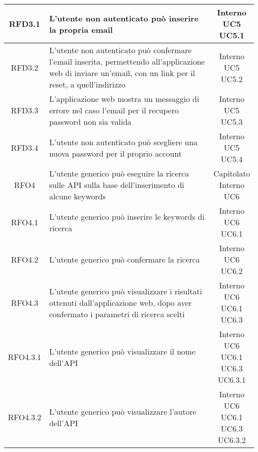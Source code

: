 \begin{longtable}{|c|p{8cm}|c|}
\hypertarget{RFD3.1}{RFD3.1} & L'utente non autenticato può inserire la propria email & \makecell*{Interno\\UC5\\UC5.1} \\
\hline
\hypertarget{RFD3.2}{RFD3.2} & L'utente non autenticato può confermare l'email inserita, permettendo all'applicazione web di inviare un'email, con un link per il reset, a quell'indirizzo & \makecell*{Interno\\UC5\\UC5.2} \\
\hline
\hypertarget{RFD3.3}{RFD3.3} & L'applicazione web mostra un messaggio di errore nel caso l'email per il recupero password non sia valida & \makecell*{Interno\\UC5\\UC5.3} \\
\hline
\hypertarget{RFD3.4}{RFD3.4} & L'utente non autenticato può scegliere una nuova password per il proprio account & \makecell*{Interno\\UC5\\UC5.4} \\
\hline

\hypertarget{RFO4}{RFO4} & L'utente generico può eseguire la ricerca sulle API sulla base dell'inserimento di alcune keywords & \makecell*{Capitolato\\Interno\\UC6} \\
\hline

\hypertarget{RFO4.1}{RFO4.1} & L'utente generico può inserire le keywords di ricerca & \makecell*{Interno\\UC6\\UC6.1} \\
\hline
\hypertarget{RFO4.2}{RFO4.2} & L'utente generico può confermare la ricerca  & \makecell*{Interno\\UC6\\UC6.2} \\
\hline

\hypertarget{RFO4.3}{RFO4.3} & L'utente generico può visualizzare i risultati ottenuti dall'applicazione web, dopo aver confermato i parametri di ricerca scelti & \makecell*{Interno\\UC6\\UC6.1\\UC6.3} \\
\hline
\hypertarget{RFO4.3.1}{RFO4.3.1} & L'utente generico può visualizzare il nome dell'API & \makecell*{Interno\\UC6\\UC6.1\\UC6.3\\UC6.3.1} \\
\hline
\hypertarget{RFO4.3.2}{RFO4.3.2} & L'utente generico può visualizzare l'autore dell'API & \makecell*{Interno\\UC6\\UC6.1\\UC6.3\\UC6.3.2} \\
\hline


\end{longtable}
